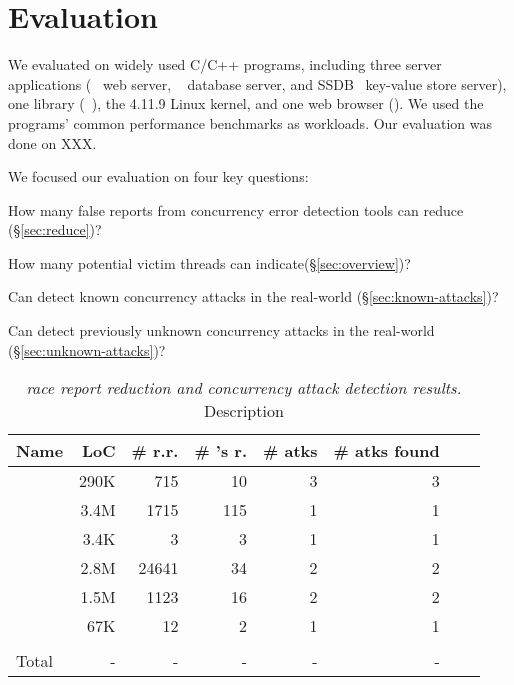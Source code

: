 \section{Evaluation}\label{sec:evaluation}

We evaluated \xxx on \nreproducedProgs widely used C/C++ programs, including 
three server applications (\apache~\cite{apache} web server, 
\mysql~\cite{mysql} database server, and SSDB~\cite{SSDB} 
key-value store server), one library (\libsafe~\cite{libsafe}), the 4.11.9 Linux 
kernel, and one web browser (\chrome). We used the programs' common performance 
benchmarks as workloads. Our evaluation was done on XXX. 


We focused our evaluation on four key questions:
\begin{tightenum}
	
	
	\item How many false reports from concurrency error 
	detection tools can \xxx reduce (\S\ref{sec:reduce})?
	
	\item How many potential victim threads can \xxx indicate(\S\ref{sec:overview})?
	
	\item Can \xxx detect known concurrency attacks in the real-world
	(\S\ref{sec:known-attacks})?
	
	\item Can \xxx detect previously unknown concurrency attacks in the real-world
	(\S\ref{sec:unknown-attacks})?
	
	
\end{tightenum}


\begin{table}[ht!]
	\footnotesize
	\centering
	\begin{tabular}{l|r|r|r|r|r|r|r}
		{\bf Name} & {\bf LoC} & {\bf \# r.r.}& {\bf \# \xxx's r.} & {\bf \# atks} & {\bf \# atks found}  \\
		\hline
		\apache    &    290K    &   715  &  10   &  3  & 3 \\
		\chrome    &   3.4M   & 1715  &  115 &  1  & 1 \\
		\libsafe   &   3.4K     & 3  & 3 & 1 &  1 \\
		\linux     &     2.8M    & 24641  & 34  &  2  & 2  \\
		\mysql     &    1.5M    & 1123 &  16  &  2  & 2 \\
		\ssdb      &  67K   &  12  &  2  &  1  & 1  \\
		\hline\\[-2.3ex]
		Total      &   -    &  -  &  - &  - & - \\
	\end{tabular}
	\vspace{-.1in}
	\caption{{\em \xxx race report reduction and concurrency attack detection results.} \rm {Description}} 
	\label{tab:eval}
	\vspace{-.2in}
\end{table}




